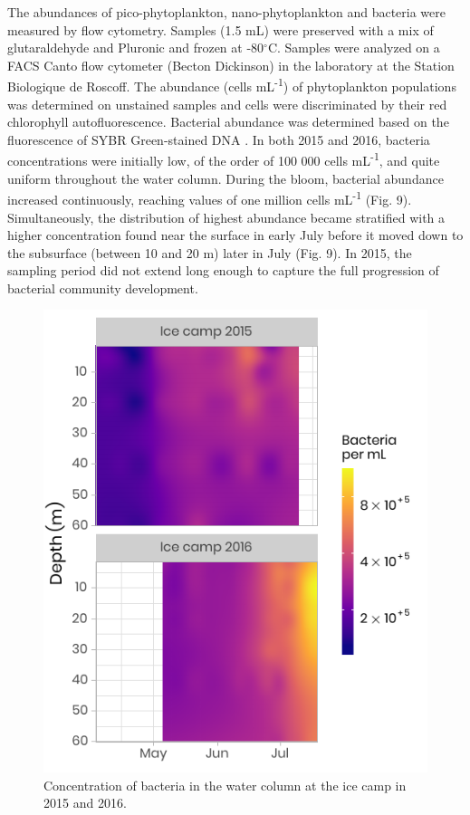 \documentclass[essd, manuscript]{copernicus}
\begin{document}
The abundances of pico-phytoplankton, nano-phytoplankton and bacteria were measured by flow cytometry. Samples (1.5 mL) were preserved with a mix of glutaraldehyde and Pluronic \citep{Marie2014} and frozen at -80$^{\circ}$C. Samples were analyzed on a FACS Canto flow cytometer (Becton Dickinson) in the laboratory at the Station Biologique de Roscoff. The abundance (cells mL\textsuperscript{-1}) of phytoplankton populations was determined on unstained samples and cells were discriminated by their red chlorophyll autofluorescence. Bacterial abundance was determined based on the fluorescence of SYBR Green-stained DNA \citep{Marie1997}. In both 2015 and 2016, bacteria concentrations were initially low, of the order of 100 000 cells mL\textsuperscript{-1}, and quite uniform throughout the water column. During the bloom, bacterial abundance increased continuously,  reaching values of one million cells mL\textsuperscript{-1} (Fig. 9). Simultaneously, the distribution of highest abundance became stratified with a higher concentration found near the surface in early July before it moved down to the subsurface (between 10 and 20 m) later in July (Fig. 9). In 2015, the sampling period did not extend long enough to capture the full progression of bacterial community development.

\begin{figure}[H]
	\centering
	\includegraphics[scale = 1]{../../../../graphs/fig09.pdf}
	\caption{Concentration of bacteria in the water column at the ice camp in 2015 and 2016.}
\end{figure}
\end{document}
